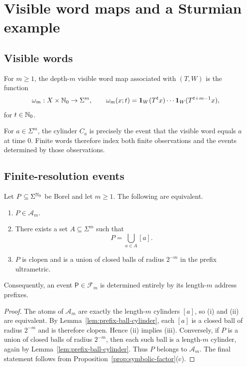 \section{Visible word maps and a Sturmian example}\label{sec:spg}

\subsection{Visible words}

\begin{definition}
For \(m\ge 1\), the depth-\(m\) visible word map associated with
\((T,W)\) is the function
\[
  \omega_m:X\times\mathbb{N}_0\to\Sigma^m,
  \qquad
  \omega_m(x;t)=\mathbf{1}_W(T^t x)\cdots \mathbf{1}_W(T^{t+m-1}x),
\]
for \(t\in\mathbb{N}_0\).
\end{definition}

For \(a\in\Sigma^m\), the cylinder \(C_a\) is precisely the event that
the visible word equals \(a\) at time \(0\).  Finite words therefore
index both finite observations and the events determined by those
observations.

\subsection{Finite-resolution events}

\begin{proposition}\label{prop:decidable-clopen}
Let $P\subseteq\Sigma^{\mathbb{N}_0}$ be Borel and let $m\ge 1$. The following are
equivalent.
\begin{enumerate}[label=(\roman*)]
  \item $P\in\mathcal{A}_m$.
  \item There exists a set $A\subseteq\Sigma^m$ such that
  \[
    P=\bigcup_{a\in A}[a].
  \]
  \item $P$ is clopen and is a union of closed balls of radius $2^{-m}$ in the
  prefix ultrametric.
\end{enumerate}
Consequently, an event $\mathsf{P}\in\mathcal{F}_m$ is determined entirely by
its length-$m$ address prefixes.
\end{proposition}

\begin{proof}
The atoms of $\mathcal{A}_m$ are exactly the length-$m$ cylinders $[a]$, so (i)
and (ii) are equivalent.
By Lemma~\ref{lem:prefix-ball-cylinder}, each $[a]$ is a closed ball of radius
$2^{-m}$ and is therefore clopen. Hence (ii) implies (iii).
Conversely, if $P$ is a union of closed balls of radius $2^{-m}$, then each
such ball is a length-$m$ cylinder, again by
Lemma~\ref{lem:prefix-ball-cylinder}. Thus $P$ belongs to $\mathcal{A}_m$.
The final statement follows from Proposition~\ref{prop:symbolic-factor}(c).
\end{proof}

